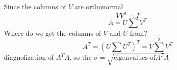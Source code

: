 \markdownRendererInterblockSeparator
{}Since the columns of $V$ are orthonormal\markdownRendererEllipsis{}\markdownRendererInterblockSeparator
{}$$VV^T=I$$\markdownRendererInterblockSeparator
{}$$A = U\sum V^T$$\markdownRendererInterblockSeparator
{}Where do we get the columns of $V$ and $U$ from?\markdownRendererInterblockSeparator
{}$$A^T = (U\sum U^T)^T=V\sum^2 V^T$$\markdownRendererInterblockSeparator
{}diagnolization of $A^TA$, so the $\sigma=\sqrt{\text{eigenvalues of}A^TA}$\relax